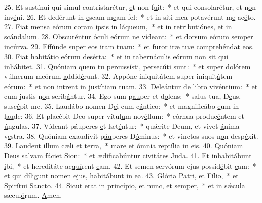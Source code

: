 25. Et sustínui qui simul contristarétur, \uline{e}t non f\uline{u}it:~* et qui consolarétur, et n\uline{o}n inv\uline{é}ni.
26. Et dedérunt in \uline{e}scam m\uline{e}am fel:~* et in siti mea potavérunt m\uline{e} ac\uline{é}to.
27. Fiat mensa eórum coram \uline{i}psis in l\uline{á}queum,~* et in retributiónes, \uline{e}t in sc\uline{á}ndalum.
28. Obscuréntur óculi e\uline{ó}rum ne v\uline{í}deant:~* et dorsum eórum s\uline{e}mper inc\uline{ú}rva.
29. Effúnde super eos \uline{i}ram t\uline{u}am:~* et furor iræ tuæ compreh\uline{é}ndat \uline{e}os.
30. Fiat habitátio e\uline{ó}rum des\uline{é}rta:~* et in tabernáculis eórum non sit \uline{qui} inh\uline{á}bitet.
31. Quóniam quem tu percussísti, p\uline{e}rsec\uline{ú}ti sunt:~* et super dolórem vúlnerum meórum \uline{a}ddid\uline{é}runt.
32. Appóne iniquitátem super iniquit\uline{á}tem e\uline{ó}rum:~* et non intrent in just\uline{í}tiam t\uline{u}am.
33. Deleántur de l\uline{i}bro viv\uline{é}ntium:~* et cum justis n\uline{o}n scrib\uline{á}ntur.
34. Ego sum p\uline{au}per et d\uline{o}lens:~* salus tua, D\uline{e}us, susc\uline{é}pit me.
35. Laudábo nomen D\uline{e}i cum c\uline{á}ntico:~* et magnificábo \uline{e}um in l\uline{au}de:
36. Et placébit Deo super vítul\uline{u}m nov\uline{é}llum:~* córnua produc\uline{é}ntem et \uline{ú}ngulas.
37. Vídeant páuperes \uline{e}t læt\uline{é}ntur:~* quǽrite Deum, et vivet \uline{á}nima v\uline{e}stra.
38. Quóniam exaudívit p\uline{áu}peres D\uline{ó}minus:~* et vinctos suos n\uline{o}n desp\uline{é}xit.
39. Laudent illum c\uline{æ}li et t\uline{e}rra,~* mare et ómnia reptíli\uline{a} in \uline{e}is.
40. Quóniam Deus salvam f\uline{á}ciet S\uline{i}on:~* et ædificabúntur civit\uline{á}tes J\uline{u}da.
41. Et inhabit\uline{á}bunt \uline{i}bi,~* et hereditáte ac\uline{quí}rent \uline{e}am.
42. Et semen servórum ejus possid\uline{é}bit \uline{e}am:~* et qui díligunt nomen ejus, habit\uline{á}bunt in \uline{e}a.
43. Glória P\uline{a}tri, et F\uline{í}lio,~* et Spir\uline{í}tui S\uline{a}ncto.
44. Sicut erat in princípio, et n\uline{u}nc, et s\uline{e}mper,~* et in sǽcula sæcul\uline{ó}rum. \uline{A}men.
